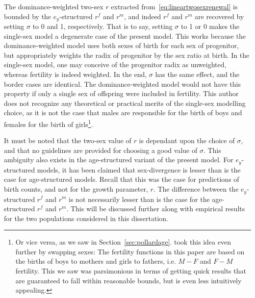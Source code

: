 The dominance-weighted two-sex $r$ extracted from~\eqref{eq:lineartwosexrenewal} 
is bounded by the $e_y$-structured $r^f$ and $r^m$,
and indeed $r^f$ and $r^m$ are recovered by setting $\sigma$ to 0 and 1,
respectively. That is to say, setting $\sigma$ to 1 or 0 makes the single-sex
model a degenerate case of the present model. This works because the
dominance-weighted model uses both sexes of birth for each sex of progenitor,
but appropriately weights the radix of progenitor by the sex ratio at birth.
In the single-sex model, one may conceive of the progenitor radix as
unweighted, whereas fertility is indeed weighted. In the end, $\sigma$ has the
same effect, and the border cases are identical. The dominance-weighted model
would not have this property if only a single sex of offspring were included in
 fertility. This author does not recognize any theoretical or practical merits
 of the single-sex modelling choice, as it is not the case that males are 
 responsible for the birth of boys and females for the birth of 
 girls\footnote{Or vice versa, as we saw in
 Section~\ref{sec:pollardage}. \citet{pollard1948measurement} took this idea
 even further by swapping sexes: The fertility functions in this paper 
 are based on the births of boys to mothers and girls to 
fathers, i.e. $M-F$ and $F-M$ fertility. This we saw was parsimonious in terms 
of getting quick results that are guaranteed to fall within reasonable 
bounds, but is even less intuitively appealing.}.

It must be
noted that the two-sex value of $r$ is dependant upon the choice of $\sigma$, 
and that no guidelines are provided for choosing a good value of $\sigma$. 
This ambiguity also exists in the age-structured variant of the present model. 
For $e_y$-structured models, it has been claimed that sex-divergence is 
lesser than is the case for
age-structured models. Recall that this was the case for predictions of birth
counts, and not for the growth parameter, $r$. The
difference between the $e_y$-structured $r^f$ and $r^m$ is not necessarily 
lesser than is the case for the age-structured $r^f$ and $r^m$. This will be
discussed further along with empirical results for the two populations 
considered in this dissertation.
